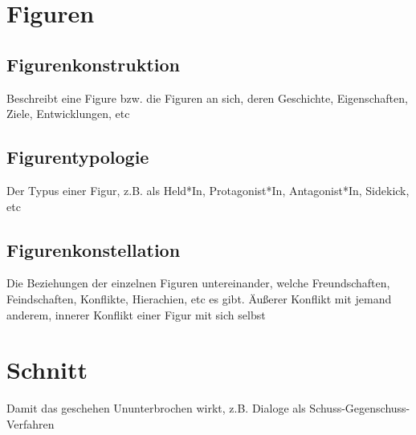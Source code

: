 \documentclass{article}
\begin{document}
\section{Figuren}
\subsection{Figurenkonstruktion}
Beschreibt eine Figure bzw. die Figuren an sich, deren Geschichte, Eigenschaften, Ziele, Entwicklungen, etc 
 
\subsection{Figurentypologie} 
Der Typus einer Figur, z.B. als Held*In, Protagonist*In, Antagonist*In, Sidekick, etc 
 
\subsection{Figurenkonstellation}
Die Beziehungen der einzelnen Figuren untereinander, welche Freundschaften, Feindschaften, Konflikte, Hierachien, etc es gibt. \newline
Äußerer Konflikt mit jemand anderem, innerer Konflikt einer Figur mit sich selbst
 
\section{Schnitt}
Damit das geschehen Ununterbrochen wirkt, z.B. Dialoge als Schuss-Gegenschuss-Verfahren
 
\end{document}
